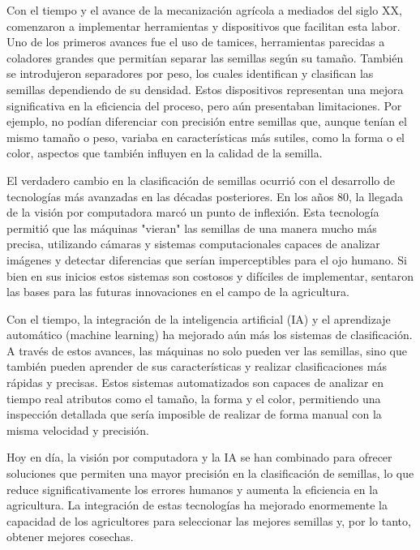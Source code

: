 Con el tiempo y el avance de la mecanización agrícola a mediados del siglo XX, comenzaron a implementar herramientas y dispositivos que facilitan esta labor. Uno de los primeros avances fue el uso de tamices, herramientas parecidas a coladores grandes que permitían separar las semillas según su tamaño. También se introdujeron separadores por peso, los cuales identifican y clasifican las semillas dependiendo de su densidad. Estos dispositivos representan una mejora significativa en la eficiencia del proceso, pero aún presentaban limitaciones. Por ejemplo, no podían diferenciar con precisión entre semillas que, aunque tenían el mismo tamaño o peso, variaba en características más sutiles, como la forma o el color, aspectos que también influyen en la calidad de la semilla.

El verdadero cambio en la clasificación de semillas ocurrió con el desarrollo de tecnologías más avanzadas en las décadas posteriores. En los años 80, la llegada de la visión por computadora marcó un punto de inflexión. Esta tecnología permitió que las máquinas "vieran" las semillas de una manera mucho más precisa, utilizando cámaras y sistemas computacionales capaces de analizar imágenes y detectar diferencias que serían imperceptibles para el ojo humano. Si bien en sus inicios estos sistemas son costosos y difíciles de implementar, sentaron las bases para las futuras innovaciones en el campo de la agricultura.

Con el tiempo, la integración de la inteligencia artificial (IA) y el aprendizaje automático (machine learning) ha mejorado aún más los sistemas de clasificación. A través de estos avances, las máquinas no solo pueden ver las semillas, sino que también pueden aprender de sus características y realizar clasificaciones más rápidas y precisas. Estos sistemas automatizados son capaces de analizar en tiempo real atributos como el tamaño, la forma y el color, permitiendo una inspección detallada que sería imposible de realizar de forma manual con la misma velocidad y precisión.

Hoy en día, la visión por computadora y la IA se han combinado para ofrecer soluciones que permiten una mayor precisión en la clasificación de semillas, lo que reduce significativamente los errores humanos y aumenta la eficiencia en la agricultura. La integración de estas tecnologías ha mejorado enormemente la capacidad de los agricultores para seleccionar las mejores semillas y, por lo tanto, obtener mejores cosechas.


